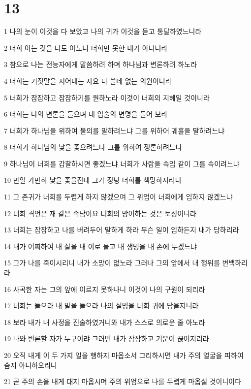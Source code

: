 \chapter{13}

\par 1 나의 눈이 이것을 다 보았고 나의 귀가 이것을 듣고 통달하였느니라
\par 2 너희 아는 것을 나도 아노니 너희만 못한 내가 아니니라
\par 3 참으로 나는 전능자에게 말씀하려 하며 하나님과 변론하려 하노라
\par 4 너희는 거짓말을 지어내는 자요 다 쓸데 없는 의원이니라
\par 5 너희가 잠잠하고 잠잠하기를 원하노라 이것이 너희의 지혜일 것이니라
\par 6 너희는 나의 변론을 들으며 내 입술의 변명을 들어 보라
\par 7 너희가 하나님을 위하여 불의를 말하려느냐 그를 위하어 궤휼을 말하려느냐
\par 8 너희가 하나님의 낯을 좇으려느냐 그를 위하여 쟁론하려느냐
\par 9 하나님이 너희를 감찰하시면 좋겠느냐 너희가 사람을 속임 같이 그를 속이려느냐
\par 10 만일 가만히 낯을 좇을진대 그가 정녕 너희를 책망하시리니
\par 11 그 존귀가 너희를 두렵게 하지 않겠으며 그 위엄이 너희에게 임하지 않겠느냐
\par 12 너희 격언은 재 같은 속담이요 너희의 방어하는 것은 토성이니라
\par 13 너희는 잠잠하고 나를 버려두어 말하게 하라 무슨 일이 임하든지 내가 당하리라
\par 14 내가 어찌하여 내 살을 내 이로 물고 내 생명을 내 손에 두겠느냐
\par 15 그가 나를 죽이시리니 내가 소망이 없노라 그러나 그의 앞에서 내 행위를 변백하리라
\par 16 사곡한 자는 그의 앞에 이르지 못하나니 이것이 나의 구원이 되리라
\par 17 너희는 들으라 내 말을 들으라 나의 설명을 너희 귀에 담을지니라
\par 18 보라 내가 내 사정을 진술하였거니와 내가 스스로 의로운 줄 아노라
\par 19 나와 변론할 자가 누구이랴 그러면 내가 잠잠하고 기운이 끊어지리라
\par 20 오직 내게 이 두 가지 일을 행하지 마옵소서 그리하시면 내가 주의 얼굴을 피하여 숨지 아니하오리니
\par 21 곧 주의 손을 내게 대지 마옵시며 주의 위엄으로 나를 두렵게 마옵실 것이니이다
